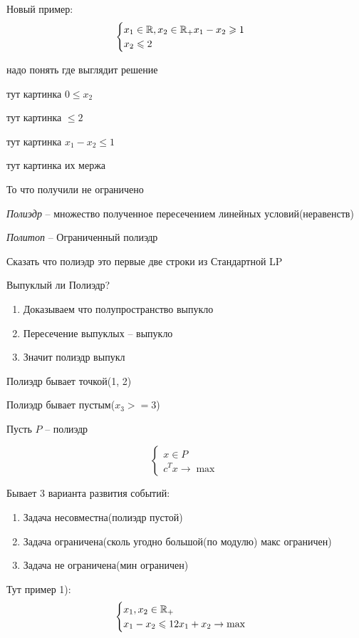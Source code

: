 Новый пример:
\[
	\begin{cases}
		x_1 \in \mathbb{R}, x_2 \in \mathbb{R}_+
		x_1 - x_2 \geqslant 1\\
		x_2 \leqslant 2
	\end{cases}
\]

надо понять где выглядит решение

тут картинка $0 \leq x_2$

тут картинка $ \leq 2$

тут картинка $x_1 - x_2 \leq 1$

тут картинка их мержа

То что получили не ограничено

\begin{definition}
	\emph{Полиэдр} -- множество полученное пересечением линейных условий(неравенств)
\end{definition}


\begin{definition}
	\emph{Политоп} -- Ограниченный полиэдр
\end{definition}

Сказать что полиэдр это первые две строки из Стандартной LP

Выпуклый ли Полиэдр?
\begin{enumerate}
	\item Доказываем что полупространство выпукло
	\item Пересечение выпуклых -- выпукло
	\item Значит полиэдр выпукл
\end{enumerate}

Полиэдр бывает точкой(1, 2)

Полиэдр бывает пустым($x_3 >= 3$)

Пусть $P$ -- полиэдр

\[
	\begin{cases}
		x \in P\\
		c^T x \to \max
	\end{cases}
\]

Бывает 3 варианта развития событий:
\begin{enumerate}
	\item Задача несовместна(полиэдр пустой)
	\item Задача ограничена(сколь угодно большой(по модулю) макс ограничен)
	\item Задача не ограничена(мин ограничен)
\end{enumerate}
Тут пример 1): 
\[
	\begin{cases}
		x_1, x_2 \in \mathbb{R}_+\\
		x_1 - x_2 \leqslant 1
		2 x_1 + x_2 \to \max
	\end{cases}	
\]

